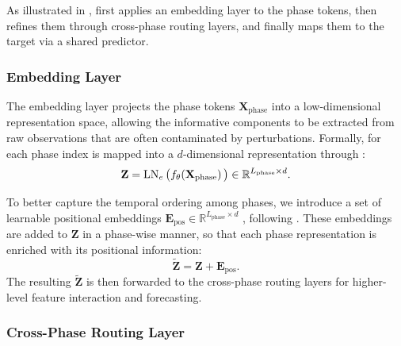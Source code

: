 As illustrated in ,  first applies an embedding layer to the phase tokens, then refines them through  cross-phase routing layers, and finally maps them to the target via a shared predictor.

\subsubsection{Embedding Layer}
The embedding layer projects the phase tokens $\mathbf{X}_{\text{phase}}$ into a low-dimensional representation space, allowing the informative components to be extracted from raw observations that are often contaminated by perturbations.
Formally, for each phase index  is mapped into a $d$-dimensional representation through :
\begin{equation}
\mathbf{Z}
= \operatorname{LN}_e\big(f_{\theta}\!\left(\mathbf{X}_{\text{phase}}\right)\big)\in \mathbb{R}^{L_{\text{phase}}\times d}.
\end{equation}

To better capture the temporal ordering among phases, we introduce a set of learnable positional embeddings $\mathbf{E}_{\text{pos}}\in\mathbb{R}^{L_{\text{phase}}\times d}$ , following \cite{liu2023spatio}.
These embeddings are added to $\mathbf{Z}$ in a phase-wise manner, so that each phase representation is enriched with its positional information:
\begin{equation}
\tilde{\mathbf{Z}}=\mathbf{Z}+\mathbf{E}_{\text{pos}}.
\end{equation}
The resulting $\tilde{\mathbf{Z}}$ is then forwarded to the cross-phase routing layers for higher-level feature interaction and forecasting.

\subsubsection{Cross-Phase Routing Layer}

